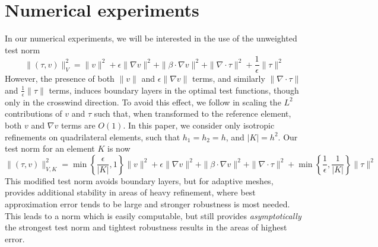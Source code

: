 \documentclass[11pt,onecolumn]{scrartcl}
\newcommand{\grad}{\nabla}
\renewcommand{\div}{\grad \cdot}
\begin{document}

\section{Numerical experiments}

In our numerical experiments, we will be interested in the use of the unweighted test norm 
\[
\|\left(\tau, v\right)\|_{V}^2 = \|v\|^2 + \epsilon \|\grad v\|^2 + \|\beta \cdot \grad v\|^2 + \| \div \tau\|^2 + \frac{1}{\epsilon}\|\tau\|^2
\]
However, the presence of both $\|v\|$ and $\epsilon\|\grad v\|$ terms, and similarly $\|\div \tau\|$ and $\frac{1}{\epsilon}\|\tau\|$ terms, induces boundary layers in the optimal test functions, though only in the crosswind direction.  To avoid this effect, we follow \cite{DPGrobustness} in scaling the $L^2$ contributions of $v$ and $\tau$ such that, when transformed to the reference element, both $v$ and $\grad v$ terms are $O(1)$.  In this paper, we consider only isotropic refinements on quadrilateral elements, such that $h_1 = h_2 = h$, and $|K| = h^2$. Our test norm for an element $K$ is now
\[
\|\left(\tau, v\right)\|_{V,K}^2 = \min\left\{\frac{\epsilon}{|K|},1\right\}\|v\|^2 + \epsilon \|\grad v\|^2 + \|\beta \cdot \grad v\|^2 + \| \div \tau\|^2 + \min\left\{\frac{1}{\epsilon},\frac{1}{|K|}\right\}\|\tau\|^2
\]
This modified test norm avoids boundary layers, but for adaptive meshes, provides additional stability in areas of heavy refinement, where best approximation error tends to be large and stronger robustness is most needed.  This leads to a norm which is easily computable, but still provides \textit{asymptotically} the strongest test norm and tightest robustness results in the areas of highest error.  
\end{document}
